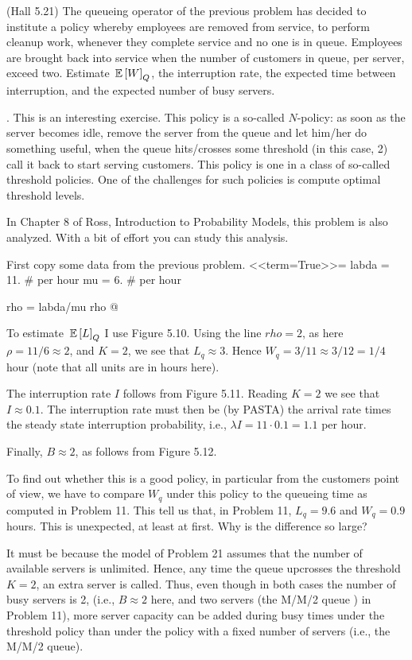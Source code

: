 \begin{question}[use=false]
  (Hall 5.21) The queueing operator of the previous problem has
  decided to institute a policy whereby employees are removed from
  service, to perform cleanup work, whenever they complete service and
  no one is in queue. Employees are brought back into service when the
  number of customers in queue, per server, exceed two. Estimate
  $\,\mathbb{E}\left[W\right]_Q$, the interruption rate, the expected time between
  interruption, and the expected number of busy servers. 
  \begin{solution}
\TBD. 
    This is an interesting exercise. This policy is a so-called
$N$-policy: as soon as the server becomes idle, remove the
server from the queue and let him/her do something useful, when the
queue hits/crosses some threshold (in this case, 2) call it back to
start serving customers. This policy is one in a class of so-called
threshold policies. One of the challenges for such policies is compute
optimal threshold levels.

In Chapter 8 of Ross, Introduction to Probability Models, this problem
is also analyzed. With a bit of effort you can study this analysis.

First copy some data from the previous problem.
<<term=True>>=
labda = 11. # per hour
mu = 6. # per hour

rho = labda/mu
rho
@ 

To estimate $\,\mathbb{E}\left[L\right]_Q$ I use Figure 5.10. Using the line $rho =
2$, as here $\rho = 11/6 \approx 2$, and $K=2$, we see
that $L_q \approx 3$. Hence $W_q = 3/11 \approx 3/12 =
1/4$ hour (note that all units are in hours here).

The interruption rate $I$ follows from Figure 5.11. Reading
$K=2$ we see that $I\approx 0.1$. The interruption rate
must then be (by PASTA) the arrival rate times the steady state
interruption probability, i.e., $\lambda I = 11\cdot 0.1 = 1.1$
per hour.

Finally, $B \approx 2$, as follows from Figure 5.12.

To find out whether this is a good policy, in particular from the
customers point of view, we have to compare $W_q$ under this
policy to the queueing time as computed in Problem 11. This tell us
that, in Problem 11, $L_q = 9.6$ and $W_q = 0.9$ hours.
This is unexpected, at least at first. Why is the difference so large?

It must be because the model of Problem 21 assumes that the number of
available servers is unlimited. Hence, any time the queue upcrosses the
threshold $K=2$, an extra server is called. Thus, even though in
both cases the number of busy servers is 2, (i.e., $B\approx 2$
here, and two servers (the M/M/2 queue ) in Problem 11), more server
capacity can be added during busy times under the threshold policy
than under the policy with a fixed number of servers (i.e., the M/M/2
queue).

  \end{solution}
\end{question}


